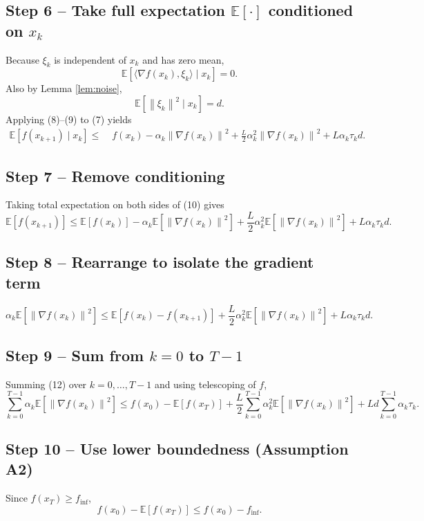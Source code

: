 \documentclass{article}
\newcommand{\E}{\mathbb{E}}
\newcommand{\norm}[1]{\left\|#1\right\|}
\newcommand{\iprod}[2]{\langle #1,#2\rangle}
\begin{document}
\subsection*{Step 6 – Take full expectation $\E[\cdot]$ conditioned on $x_{k}$}
Because $\xi_{k}$ is independent of $x_{k}$ and has zero mean,
\[
\E\!\left[\iprod{\nabla f(x_{k})}{\xi_{k}}\mid x_{k}\right]=0.
\tag{8}
\]
Also by Lemma \ref{lem:noise},
\[
\E\!\left[\norm{\xi_{k}}^{2}\mid x_{k}\right]=d.
\tag{9}
\]
Applying (8)–(9) to (7) yields
\[
\begin{aligned}
\E\!\left[f(x_{k+1})\mid x_{k}\right]
\le&\;f(x_{k})
-\alpha_{k}\norm{\nabla f(x_{k})}^{2}
+\frac{L}{2}\alpha_{k}^{2}\norm{\nabla f(x_{k})}^{2}
+L\alpha_{k}\tau_{k}d.
\end{aligned}
\tag{10}
\]

\subsection*{Step 7 – Remove conditioning}
Taking total expectation on both sides of (10) gives
\[
\E\!\left[f(x_{k+1})\right]
\le \E\!\left[f(x_{k})\right]
-\alpha_{k}\E\!\left[\norm{\nabla f(x_{k})}^{2}\right]
+\frac{L}{2}\alpha_{k}^{2}\E\!\left[\norm{\nabla f(x_{k})}^{2}\right]
+L\alpha_{k}\tau_{k}d.
\tag{11}
\]

\subsection*{Step 8 – Rearrange to isolate the gradient term}
\[
\alpha_{k}\E\!\left[\norm{\nabla f(x_{k})}^{2}\right]
\le \E\!\left[f(x_{k})-f(x_{k+1})\right]
+\frac{L}{2}\alpha_{k}^{2}\E\!\left[\norm{\nabla f(x_{k})}^{2}\right]
+L\alpha_{k}\tau_{k}d.
\tag{12}
\]

\subsection*{Step 9 – Sum from $k=0$ to $T-1$}
Summing (12) over $k=0,\dots,T-1$ and using telescoping of $f$,
\[
\sum_{k=0}^{T-1}\alpha_{k}\E\!\left[\norm{\nabla f(x_{k})}^{2}\right]
\le f(x_{0})- \E\!\left[f(x_{T})\right]
+\frac{L}{2}\sum_{k=0}^{T-1}\alpha_{k}^{2}\E\!\left[\norm{\nabla f(x_{k})}^{2}\right]
+L d\sum_{k=0}^{T-1}\alpha_{k}\tau_{k}.
\tag{13}
\]

\subsection*{Step 10 – Use lower boundedness (Assumption A2)}
Since $f(x_{T})\ge f_{\inf}$,
\[
f(x_{0})- \E\!\left[f(x_{T})\right]\le f(x_{0})-f_{\inf}.
\tag{14}
\]
\end{document}
